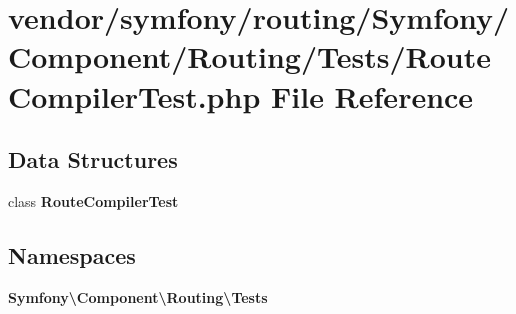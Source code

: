 \section{vendor/symfony/routing/\+Symfony/\+Component/\+Routing/\+Tests/\+Route\+Compiler\+Test.php File Reference}
\label{_route_compiler_test_8php}
\subsection*{Data Structures}
\begin{DoxyCompactItemize}
\item 
class {\bf Route\+Compiler\+Test}
\end{DoxyCompactItemize}
\subsection*{Namespaces}
\begin{DoxyCompactItemize}
\item 
 {\bf Symfony\textbackslash{}\+Component\textbackslash{}\+Routing\textbackslash{}\+Tests}
\end{DoxyCompactItemize}
